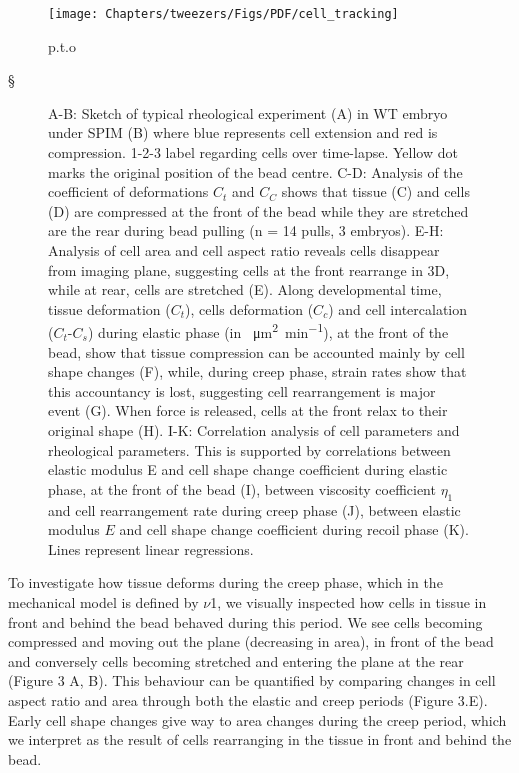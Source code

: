 \begin{landscape}
  \begin{figure}
    \centering
     \texttt{[image: Chapters/tweezers/Figs/PDF/cell\_tracking]}
     \caption{p.t.o}
      \label{fig:cell_tracking}
  \end{figure}
\end{landscape}§
\begin{figure}\ContinuedFloat
  \caption{
  A-B: Sketch of typical rheological experiment (A) in WT embryo under SPIM (B) where blue represents cell extension and red is compression. 1-2-3 label regarding cells over time-lapse.
  Yellow dot marks the original position of the bead centre.
  C-D: Analysis of the coefficient of deformations $C_t$ and $C_C$ shows that tissue (C) and cells (D) are compressed at the front of the bead while they are stretched are the rear during bead pulling (n = 14 pulls, 3 embryos).
  E-H: Analysis of cell area and cell aspect ratio reveals cells disappear from imaging plane, suggesting cells at the front rearrange in 3D, while at rear, cells are stretched (E).
  Along developmental time, tissue deformation ($C_t$), cells deformation ($C_c$) and cell intercalation ($C_t$-$C_s$) during elastic phase (in \SI{}{\micro\metre\squared\per\minute}), at the front of the bead, show that tissue compression can be accounted mainly by cell shape changes (F), while, during creep phase, strain rates show that this accountancy is lost, suggesting cell rearrangement is major event (G).
  When force is released, cells at the front relax to their original shape (H).
  I-K: Correlation analysis of cell parameters and rheological parameters.
  This is supported by correlations between elastic modulus E and cell shape change coefficient during elastic phase, at the front of the bead (I), between viscosity coefficient $\eta_1$ and cell rearrangement rate during creep phase (J), between elastic modulus $E$ and cell shape change coefficient during recoil phase (K).
  Lines represent linear regressions.
  }
\end{figure}
To investigate how tissue deforms during the creep phase, which in the mechanical model is defined by $\nu$1, we visually inspected how cells in tissue in front and behind the bead behaved during this period.
We see cells becoming compressed and moving out the plane (decreasing in area), in front of the bead and conversely cells becoming stretched and entering the plane at the rear (Figure 3 A, B).
This behaviour can be quantified by comparing changes in cell aspect ratio and area through both the elastic and creep periods (Figure 3.E).
Early cell shape changes give way to area changes during the creep period, which we interpret as the result of cells rearranging in the tissue in front and behind the bead.

